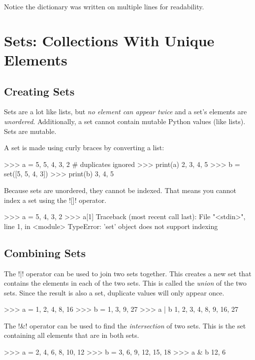 \documentclass[11pt]{cselabheader}
\begin{document}
Notice the dictionary  was written on multiple lines
for readability.

\section{Sets: Collections With Unique Elements}

\subsection{Creating Sets}

Sets are a lot like lists, but \emph{no element can appear twice} and a set's
elements are \emph{unordered}. Additionally, a set cannot contain mutable
Python values (like lists). Sets are mutable.

A set is made using curly braces by converting a list:

\begin{pyconcode}
>>> a = {5, 5, 4, 3, 2} # duplicates ignored
>>> print(a)
{2, 3, 4, 5}
>>> b = set([5, 5, 4, 3])
>>> print(b)
{3, 4, 5}

\end{pyconcode}

Because sets are unordered, they cannot be indexed. That means you
cannot index a set using the \pythoninline![]! operator.
\begin{pyconcode}
>>> a = {5, 4, 3, 2}
>>> a[1]
Traceback (most recent call last):
  File "<stdin>", line 1, in <module>
TypeError: 'set' object does not support indexing

\end{pyconcode}

\subsection{Combining Sets}

The \pythoninline!|! operator can be used to join two sets together. This creates
a new set that contains the elements in each of the two sets. This is called
the \emph{union} of the two sets. Since the result is also a set, duplicate
values will only appear once.

\begin{pyconcode}
>>> a = {1, 2, 4, 8, 16}
>>> b = {1, 3, 9, 27}
>>> a | b
{1, 2, 3, 4, 8, 9, 16, 27}

\end{pyconcode}

The \pythoninline!&! operator can be used to find the \emph{intersection} of two sets.
This is the set containing all elements that are in both sets.
\begin{pyconcode}
>>> a = {2, 4, 6, 8, 10, 12}
>>> b = {3, 6, 9, 12, 15, 18}
>>> a & b
{12, 6}

\end{pyconcode}
\end{document}
